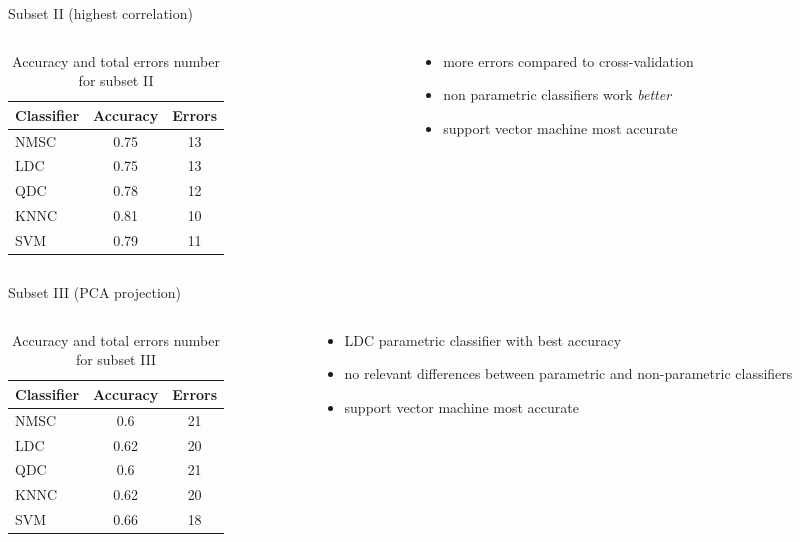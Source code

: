 \documentclass{beamer}
\begin{document}
\begin{frame}{Subset II (highest correlation)}
\begin{columns}[t]
\begin{column}{.5\textwidth}
\begin{table}
\begin{tabular}{l || c | c  }
Classifier & Accuracy & Errors \\
\hline \hline
NMSC & 0.75 & 13  \\ 
LDC & 0.75 & 13 \\
QDC & 0.78 & 12 \\
KNNC & 0.81 & 10 \\
SVM & 0.79 & 11
\end{tabular}
\caption{{\scriptsize Accuracy and total errors number for subset II}}
\end{table}
\end{column}
\begin{column}{.5\textwidth}
\begin{itemize}
  \item{
    more errors compared to cross-validation
    }
  \item{
    non parametric classifiers work \emph{better}
  }
  \item{
  support vector machine most accurate
  }
  \end{itemize}
\end{column}
\end{columns}
\end{frame}


\begin{frame}{Subset III (PCA projection)}
\begin{columns}[t]
\begin{column}{.5\textwidth}
\begin{table}
\begin{tabular}{l || c | c  }
Classifier & Accuracy & Errors \\
\hline \hline
NMSC & 0.6 & 21  \\ 
LDC & 0.62 & 20 \\
QDC & 0.6 & 21 \\
KNNC & 0.62 & 20 \\
SVM & 0.66 & 18
\end{tabular}
\caption{{\scriptsize Accuracy and total errors number for subset III}}
\end{table}
\end{column}
\begin{column}{.5\textwidth}
\begin{itemize}
  \item{
    LDC parametric classifier with best accuracy
    }
  \item{
    no relevant differences between parametric and non-parametric classifiers
  }
  \item{
  support vector machine most accurate
  }
  \end{itemize}
\end{column}
\end{columns}
\end{frame}
\end{document}
